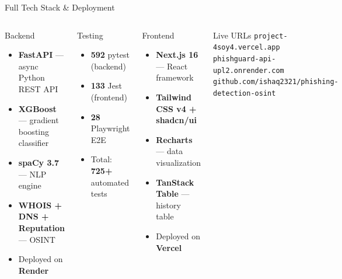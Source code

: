 \documentclass[aspectratio=169,10pt]{beamer}
\begin{document}
\begin{frame}{Full Tech Stack \& Deployment}
  \vspace{0.3cm}
  \begin{columns}[T]
      \begin{block}{Backend}
        \begin{itemize}
          \item \textbf{FastAPI} — async Python REST API
          \item \textbf{XGBoost} — gradient boosting classifier
          \item \textbf{spaCy 3.7} — NLP engine
          \item \textbf{WHOIS + DNS + Reputation} — OSINT
          \item Deployed on \textbf{Render}
        \end{itemize}
      \end{block}
      \vspace{0.3cm}
      \begin{block}{Testing}
        \begin{itemize}
          \item \textbf{592} pytest (backend)
          \item \textbf{133} Jest (frontend)
          \item \textbf{28} Playwright E2E
          \item Total: \textbf{725+} automated tests
        \end{itemize}
      \end{block}
      \begin{block}{Frontend}
        \begin{itemize}
          \item \textbf{Next.js 16} — React framework
          \item \textbf{Tailwind CSS v4 + shadcn/ui}
          \item \textbf{Recharts} — data visualization
          \item \textbf{TanStack Table} — history table
          \item Deployed on \textbf{Vercel}
        \end{itemize}
      \end{block}
      \vspace{0.3cm}
      \begin{exampleblock}{Live URLs}
        \small
        \texttt{project-4soy4.vercel.app}\\
        \texttt{phishguard-api-upl2.onrender.com}\\
        \texttt{github.com/ishaq2321/phishing-detection-osint}
      \end{exampleblock}
  \end{columns}
\end{frame}
\end{document}
